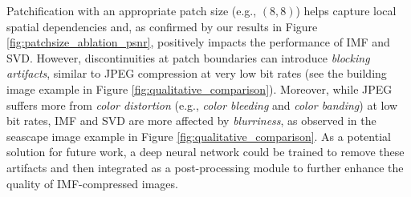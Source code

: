 Patchification with an appropriate patch size (e.g., $(8, 8)$) helps capture local spatial dependencies and, as confirmed by our results in Figure \ref{fig:patchsize_ablation_psnr}, positively impacts the performance of IMF and SVD. However, discontinuities at patch boundaries can introduce \emph{blocking artifacts}, similar to JPEG compression at very low bit rates (see the building image example in Figure \ref{fig:qualitative_comparison}). Moreover, while JPEG suffers more from \emph{color distortion} (e.g., \emph{color bleeding} and \emph{color banding}) at low bit rates, IMF and SVD are more affected by \emph{blurriness}, as observed in the seascape image example in Figure \ref{fig:qualitative_comparison}. As a potential solution for future work, a deep neural network could be trained to remove these artifacts and then integrated as a post-processing module to further enhance the quality of IMF-compressed images.

